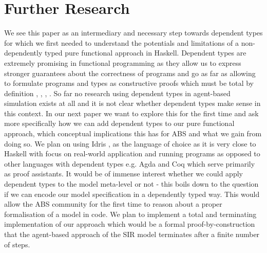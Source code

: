 \section{Further Research}
\label{sec:further_research}

We see this paper as an intermediary and necessary step towards dependent types for which we first needed to understand the potentials and limitations of a non-dependently typed pure functional approach in Haskell. Dependent types are extremely promising in functional programming as they allow us to express stronger guarantees about the correctness of programs and go as far as allowing to formulate programs and types as constructive proofs \cite{wadler_propositions_2015} which must be total by definition \cite{thompson_type_1991}, \cite{altenkirch_why_2005}, \cite{altenkirch_pi_2010}, \cite{program_homotopy_2013}. So far no research using dependent types in agent-based simulation exists at all and it is not clear whether dependent types make sense in this context. In our next paper we want to explore this for the first time and ask more specifically how we can add dependent types to our pure functional approach, which conceptual implications this has for ABS and what we gain from doing so. We plan on using Idris \cite{brady_idris_2013}, \cite{brady_type-driven_2017} as the language of choice as it is very close to Haskell with focus on real-world application and running programs as opposed to other languages with dependent types e.g. Agda and Coq which serve primarily as proof assistants.
It would be of immense interest whether we could apply dependent types to the model meta-level or not - this boils down to the question if we can encode our model specification in a dependently typed way. This would allow the ABS community for the first time to reason about a proper formalisation of a model in code. We plan to implement a total and terminating implementation of our approach which would be a formal proof-by-construction that the agent-based approach of the SIR model terminates after a finite number of steps.